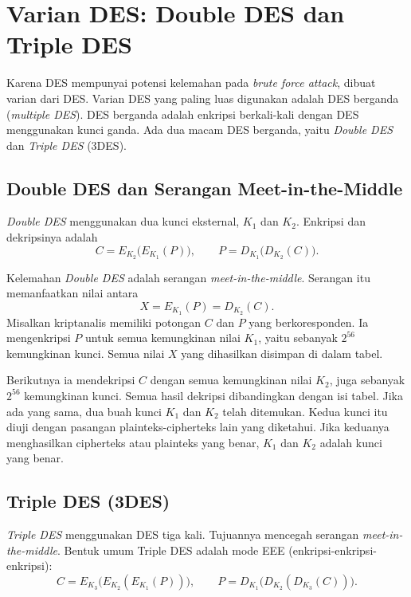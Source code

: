 \section{Varian DES: Double DES dan Triple DES}

Karena DES mempunyai potensi kelemahan pada \textit{brute force attack},
dibuat varian dari DES. Varian DES yang paling luas digunakan adalah DES
berganda (\textit{multiple DES}). DES berganda adalah enkripsi berkali-kali
dengan DES menggunakan kunci ganda. Ada dua macam DES berganda, yaitu
\textit{Double DES} dan \textit{Triple DES} (3DES).

\subsection{Double DES dan Serangan Meet-in-the-Middle}

\textit{Double DES} menggunakan dua kunci eksternal, $K_1$ dan $K_2$. Enkripsi
dan dekripsinya adalah
\begin{equation}
C = E_{K_2}\bigl(E_{K_1}(P)\bigr),
\qquad P = D_{K_1}\bigl(D_{K_2}(C)\bigr).
\label{eq:des-double}
\end{equation}

Kelemahan \textit{Double DES} adalah serangan \textit{meet-in-the-middle}.
Serangan itu memanfaatkan nilai antara
\begin{equation}
X = E_{K_1}(P) = D_{K_2}(C).
\label{eq:des-mitm}
\end{equation}
Misalkan kriptanalis memiliki potongan $C$ dan $P$ yang berkoresponden. Ia
mengenkripsi $P$ untuk semua kemungkinan nilai $K_1$, yaitu sebanyak $2^{56}$
kemungkinan kunci. Semua nilai $X$ yang dihasilkan disimpan di dalam tabel.

Berikutnya ia mendekripsi $C$ dengan semua kemungkinan nilai $K_2$, juga
sebanyak $2^{56}$ kemungkinan kunci. Semua hasil dekripsi dibandingkan dengan
isi tabel. Jika ada yang sama, dua buah kunci $K_1$ dan $K_2$ telah ditemukan.
Kedua kunci itu diuji dengan pasangan plainteks-cipherteks lain yang
diketahui. Jika keduanya menghasilkan cipherteks atau plainteks yang benar,
$K_1$ dan $K_2$ adalah kunci yang benar.

\subsection{Triple DES (3DES)}

\textit{Triple DES} menggunakan DES tiga kali. Tujuannya mencegah serangan
\textit{meet-in-the-middle}. Bentuk umum Triple DES adalah mode EEE
(enkripsi-enkripsi-enkripsi):
\begin{equation}
C = E_{K_3}\bigl(E_{K_2}(E_{K_1}(P))\bigr),
\qquad P = D_{K_1}\bigl(D_{K_2}(D_{K_3}(C))\bigr).
\end{equation}

